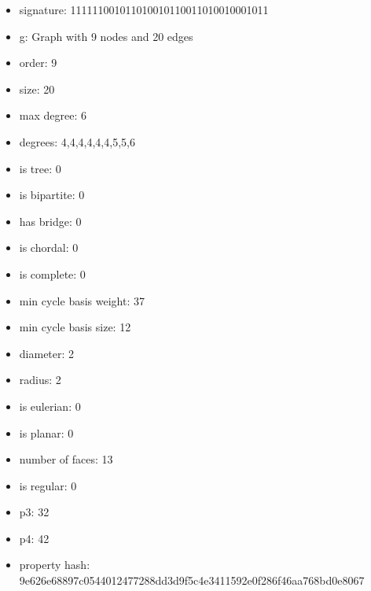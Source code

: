 \newpage
\begin{figure}
\end{figure}
\begin{itemize}
\item signature: 111111001011010010110011010010001011
\item g: Graph with 9 nodes and 20 edges
\item order: 9
\item size: 20
\item max degree: 6
\item degrees: 4,4,4,4,4,4,5,5,6
\item is tree: 0
\item is bipartite: 0
\item has bridge: 0
\item is chordal: 0
\item is complete: 0
\item min cycle basis weight: 37
\item min cycle basis size: 12
\item diameter: 2
\item radius: 2
\item is eulerian: 0
\item is planar: 0
\item number of faces: 13
\item is regular: 0
\item p3: 32
\item p4: 42
\item property hash: 9e626e68897c0544012477288dd3d9f5c4e3411592e0f286f46aa768bd0e8067
\end{itemize}
